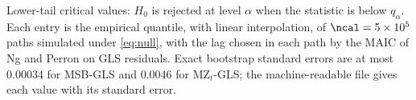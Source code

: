 Lower-tail critical values: $H_0$ is rejected at level $\alpha$ when the statistic is below $q_\alpha$. Each entry is the empirical quantile, with linear interpolation, of $\ncal = 5\times10^{5}$ paths simulated under \cref{eq:null}, with the lag chosen in each path by the MAIC of Ng and Perron on GLS residuals. Exact bootstrap standard errors are at most $0.00034$ for MSB-GLS and $0.0046$ for MZ$_t$-GLS; the machine-readable file gives each value with its standard error.
